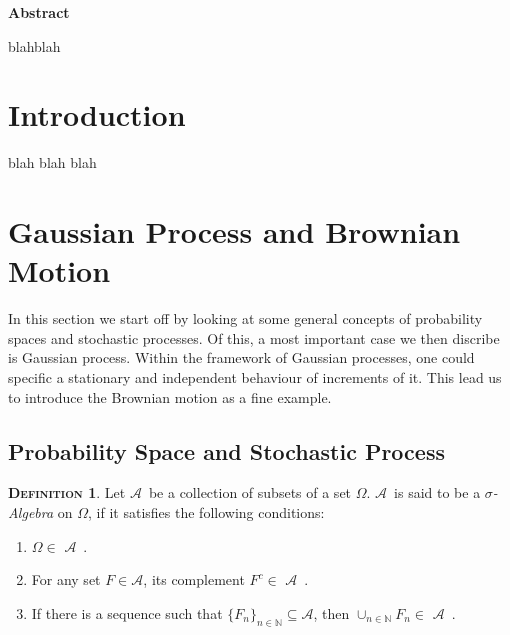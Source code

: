 \documentclass[a4paper, twoside, 11pt]{article}
\theoremstyle{definition}
\newtheorem{definition}{\scshape Definition}[section]
\def\AA{$\mathscr{A}$\ }
\newcommand{\compl}[1]{{#1}^{c}}
\renewenvironment{abstract}{
	\begin{center}
		  \Large
		  \textbf{Abstract}
		  \hspace{2em}
	\end{center}				
  }{}
\begin{document}
  
  \newpage

  \thispagestyle{empty}
  \begin{abstract}
	blahblah
  \end{abstract}
\newpage

\thispagestyle{empty}
\mbox{}
\newpage
\fancyhead[LO, RE]{}
\fancyfoot[LE, RO]{}
\tableofcontents
\newpage
\thispagestyle{empty}
\mbox{}
\newpage

\fancyhead[RO]{\leftmark}
\fancyhead[LE]{\rightmark}
\fancyfoot[LE, RO]{\large \thepage}
\setcounter{section}{0}
\setcounter{page}{1}
\section{Introduction}
blah
\newpage
blah
\newpage
blah

\newpage

\section{Gaussian Process and Brownian Motion}
In this section we start off by looking at some general concepts of probability spaces and stochastic processes. Of this, a most important case we then discribe is Gaussian process. Within the framework of Gaussian processes, one could specific a stationary and independent behaviour of increments of it. This lead us to introduce the Brownian motion as a fine example.

\subsection{Probability Space and Stochastic Process }
\begin{definition}
  Let \AA be a collection of subsets of a set $\Omega$. \AA is said to be a \emph{$\sigma$- Algebra} on $\Omega$, if it satisfies the following conditions:
  \begin{enumerate}[topsep=0pt, itemsep=-1ex, partopsep=1ex, parsep=1ex, label=(\roman*)]
	\item $\Omega \in $ \AA.
	\item For any set $F \in \mathscr{A}$, its complement $\compl{F} \in$ \AA.
	\item If there is a sequence such that $\{F_n\}_{n \in \mathbb{N}} \subseteq \mathscr{A}$, then $\cup_{n \in \mathbb{N}}F_n \in $ \AA.
  \end{enumerate}
\end{definition}
\end{document}
